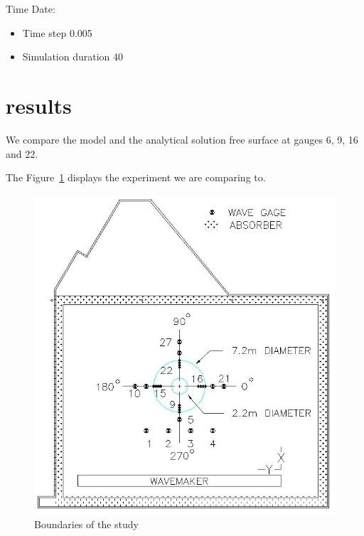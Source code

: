Time Date:
\begin{itemize}
\item Time step 0.005
\item Simulation duration 40
\end{itemize}

\section{results}

We compare the model and the analytical solution free surface at gauges 6, 9, 16 and 22.

The Figure~\ref{fig:island:exp} displays the experiment we are comparing to.
\begin{figure}
\centering
\includegraphics[width=.6\textwidth]{img/experiment.jpg}
  \caption{Boundaries of the study}\label{fig:island:exp}
\end{figure}

